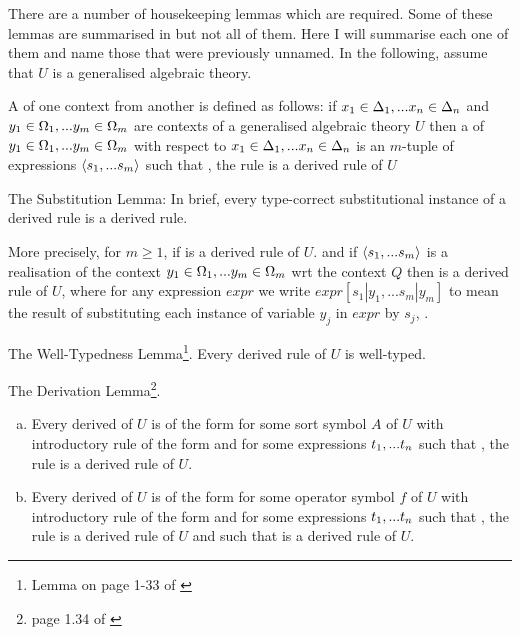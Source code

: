 \note There are a number of housekeeping lemmas which are required. Some of these lemmas are summarised in \cite{Cartmell86} but not all of them. Here I will summarise each one of them and name those that were previously unnamed. In the following, assume that $U$ is a generalised algebraic theory.

\note 
A  of one context from another is defined as follows: if $x_1 \in \Delta_1,... x_{n} \in \Delta_{n}$ and $y_1 \in \Omega_1,... y_{m} \in \Omega_{m}$ are contexts of a generalised algebraic theory $U$  then a  of  $y_1 \in \Omega_1,... y_{m} \in \Omega_{m}$ with respect to $x_1 \in \Delta_1,... x_{n} \in \Delta_{n}$ is an $m$-tuple of expressions $\langle s_1,...s_m\rangle$
such that \foreachj, the rule  is a derived rule of $U$
 
\note The Substitution Lemma: In brief, every type-correct substitutional instance of a derived rule is a derived rule. 

More precisely, for $m \geq 1$, if  is a derived rule of $U$.
and  if $\langle s_1,...s_m\rangle$ is a realisation of the context $y_1 \in \Omega_1,... y_{m} \in \Omega_{m}$ wrt the context $Q$ 
then  is a derived rule of $U$, where
for any expression $expr$ we write
$expr[s_1|y_1,...s_m|y_m]$ to mean
the result of substituting each instance of variable $y_j$ in $expr$ by $s_j$, \foreachj.

\note The Well-Typedness Lemma\footnote{Lemma on page 1-33 of \cite{Cartmell78}}. Every derived rule of $U$ is well-typed. 

\note The Derivation Lemma\footnote{page 1.34 of \cite{Cartmell78}}. 
\begin{enumerate}[(a)]

\item Every derived \Trule of $U$ is of the form
 for some sort symbol $A$ of $U$ with introductory rule of the form
 and for some expressions $t_1,...t_n$ such that \foreachi, the rule
 is a derived rule of $U$.

\item Every derived \trule of $U$ is of the form
 for some operator symbol $f$ of $U$ 
with introductory rule of the form
and for some expressions $t_1,...t_n$ such that \foreachi, the rule
 is a derived rule of $U$
and such that
 is a derived rule of $U$.
\end{enumerate}

